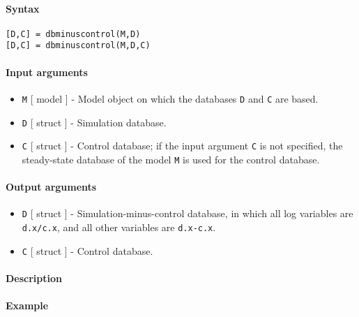 


	\paragraph{Syntax}

\begin{verbatim}
[D,C] = dbminuscontrol(M,D)
[D,C] = dbminuscontrol(M,D,C)
\end{verbatim}

\paragraph{Input arguments}

\begin{itemize}
\item
  \texttt{M} {[} model {]} - Model object on which the databases
  \texttt{D} and \texttt{C} are based.
\item
  \texttt{D} {[} struct {]} - Simulation database.
\item
  \texttt{C} {[} struct {]} - Control database; if the input argument
  \texttt{C} is not specified, the steady-state database of the model
  \texttt{M} is used for the control database.
\end{itemize}

\paragraph{Output arguments}

\begin{itemize}
\item
  \texttt{D} {[} struct {]} - Simulation-minus-control database, in
  which all log variables are \texttt{d.x/c.x}, and all other variables
  are \texttt{d.x-c.x}.
\item
  \texttt{C} {[} struct {]} - Control database.
\end{itemize}

\paragraph{Description}

\paragraph{Example}


